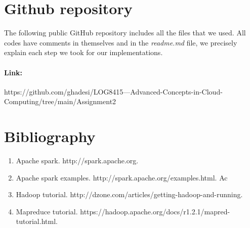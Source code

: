 \documentclass[12pt]{article}
\begin{document}
\newpage

\section{Github repository}
\noindent The following public GitHub repository  includes all the files that we used. All codes have comments in themselves and in the \textit{readme.md} file, we precisely explain each step we took for our implementations.

\paragraph{Link:} https://github.com/ghadesi/LOG8415---Advanced-Concepts-in-Cloud-Computing/tree/main/Assignment2
      
      
\newpage

\section{Bibliography}

\begin{enumerate}
    \item Apache spark. http://spark.apache.org.
    \item Apache spark examples. http://spark.apache.org/examples.html. Ac
    \item Hadoop tutorial. http://dzone.com/articles/getting-hadoop-and-running.
    \item Mapreduce tutorial. https://hadoop.apache.org/docs/r1.2.1/mapred-tutorial.html.
\end{enumerate}
\end{document}
